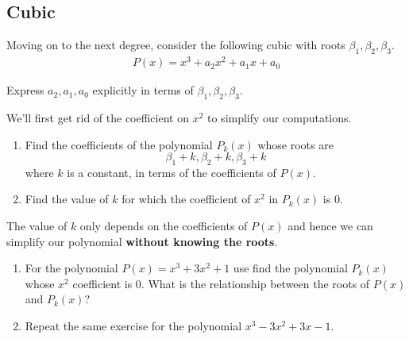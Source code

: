 \subsection{Cubic}
Moving on to the next degree, consider the following cubic with roots $ \beta_1, \beta_2, \beta_3$.
\begin{align*}
	P(x) = x^3 + a_2 x^2 + a_1 x + a_0
\end{align*}
\begin{questions}
	\item Express $ a_2, a_1, a_0$ explicitly in terms of $ \beta_1, \beta_2, \beta_3$.
\end{questions}
We'll first get rid of the coefficient on $ x^2$ to simplify our computations.
\begin{questions}[resume]
	\item \begin{enumerate}
		\item Find the coefficients of the polynomial $ P_k(x)$ whose roots are $$ \beta_1 + k, \beta_2 + k, \beta_3 + k$$ where $ k$ is a constant, in terms of the coefficients of $ P(x)$.
		\item Find the value of $ k$ for which the coefficient of $ x^2$ in $ P_k(x)$ is 0.
	\end{enumerate}
	The value of $ k$ only depends on the coefficients of $ P(x)$ and hence we can simplify our polynomial \textbf{without knowing the roots}.
	\begin{enumerate}[resume]
		\item For the polynomial $ P(x) = x^3 + 3x^2 + 1$ use find the polynomial $ P_k(x)$ whose $ x^2$ coefficient is 0. What is the relationship between the roots of $ P(x)$ and $ P_k(x)$?
		\item Repeat the same exercise for the polynomial $ x^3 - 3x^2 + 3x - 1$.
	\end{enumerate}
\end{questions}





\newpage
